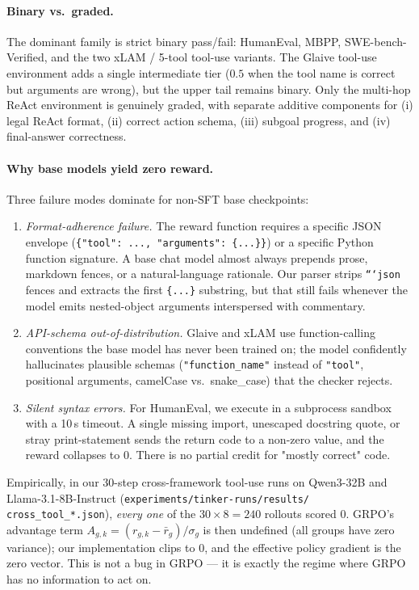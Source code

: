 \paragraph{Binary vs.~graded.} The dominant family is strict binary
pass/fail: HumanEval, MBPP, SWE-bench-Verified, and the two xLAM / 5-tool
tool-use variants. The Glaive tool-use environment adds a single
intermediate tier ($0.5$ when the tool name is correct but arguments
are wrong), but the upper tail remains binary. Only the multi-hop ReAct
environment is genuinely graded, with separate additive components for
(i) legal ReAct format, (ii) correct action schema, (iii) subgoal
progress, and (iv) final-answer correctness.

\paragraph{Why base models yield zero reward.} Three failure modes
dominate for non-SFT base checkpoints:
\begin{enumerate}
  \item \emph{Format-adherence failure.} The reward function requires a
        specific JSON envelope (\texttt{\{"tool": ..., "arguments":
        \{...\}\}}) or a specific Python function signature. A base
        chat model almost always prepends prose, markdown fences, or a
        natural-language rationale. Our parser strips
        \texttt{```json} fences and extracts the first \texttt{\{...\}}
        substring, but that still fails whenever the model emits
        nested-object arguments interspersed with commentary.
  \item \emph{API-schema out-of-distribution.} Glaive and xLAM use
        function-calling conventions the base model has never been
        trained on; the model confidently hallucinates plausible
        schemas (\texttt{"function\_name"} instead of \texttt{"tool"},
        positional arguments, camelCase vs.~snake\_case) that the
        checker rejects.
  \item \emph{Silent syntax errors.} For HumanEval, we execute in a
        subprocess sandbox with a 10\,s timeout. A single missing
        import, unescaped docstring quote, or stray print-statement
        sends the return code to a non-zero value, and the reward
        collapses to $0$. There is no partial credit for "mostly
        correct" code.
\end{enumerate}
Empirically, in our 30-step cross-framework tool-use runs on Qwen3-32B
and Llama-3.1-8B-Instruct (\texttt{experiments/tinker-runs/results/
cross\_tool\_*.json}), \emph{every one} of the $30 \times 8 = 240$
rollouts scored $0$. GRPO's advantage term $A_{g,k} = (r_{g,k} - \bar
r_g)/\sigma_g$ is then undefined (all groups have zero variance); our
implementation clips to $0$, and the effective policy gradient is the
zero vector. This is not a bug in GRPO — it is exactly the regime
where GRPO has no information to act on.


